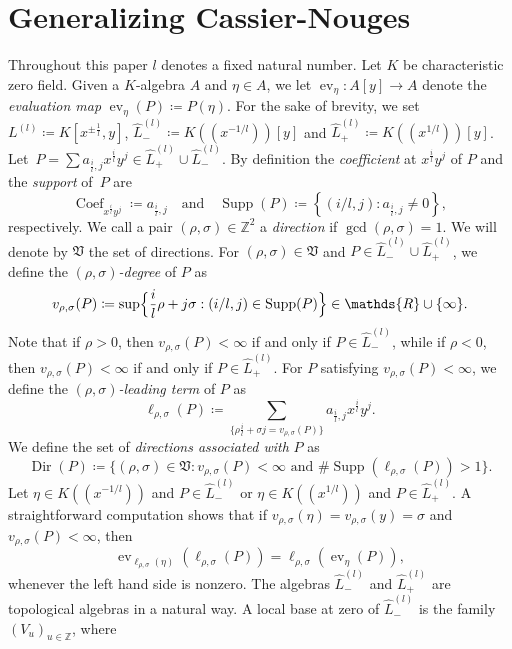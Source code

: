 \documentclass[reqno,a4paper]{amsart}
\theoremstyle{definition}
\theoremstyle{remark}
\DeclareMathOperator{\Supp}{Supp}
\DeclareMathOperator{\ev}{ev}
\DeclareMathOperator{\Dir}{Dir}
\DeclareMathOperator{\Coef}{Coef}
\begin{document}
\section{Generalizing Cassier-Nouges}

Throughout this paper $l$ denotes a fixed natural number. Let $K$ be characteristic zero field. Given a $K$-algebra $A$ and $\eta\in A$, we let
$\ev_{\eta}\colon A[y]\to A$ denote the {\em evaluation map} $\ev_{\eta}(P)\coloneqq P(\eta)$. For the sake of brevity, we set $L^{(l)}\coloneqq K[x^{\pm \frac{1}{l}},y]$, $\hat L_-^{(l)}\coloneqq K((x^{-1/l}))[y]$ and $\hat L_+^{(l)}\coloneqq K((x^{1/l}))[y]$. Let~$P=\sum a_{\frac{i}{l},j} x^{\frac{i}{l}} y^j \in \hat L_+^{(l)}\cup \hat L_-^{(l)}$. By definition the {\em coefficient} at $x^{\frac{i}{l}}y^j$ of $P$ and the {\em support} of~$P$ are
$$
\Coef_{x^{\frac{i}{l}} y^j}\coloneqq a_{\frac{i}{l},j}\quad\text{and}\quad \Supp(P) \coloneqq  \left\{\left(i/l,j\right): a_{\frac{i}{l},j}\ne 0\right\},
$$
respectively. We call a pair $(\rho,\sigma)\in \mathds{Z}^2$ a {\em direction} if $\gcd(\rho,\sigma)=1$. We will denote by $\mathfrak{V}$ the set of directions. For $(\rho,\sigma)\in \mathfrak{V}$ and $P\in \hat L_-^{(l)}\cup \hat L_+^{(l)}$, we define the {\em $(\rho,\sigma)$-degree} of $P$ as
$$
v_{\rho,\sigma}(P)\coloneqq  \sup\Bigl\{\frac{i}{l} \rho +j\sigma : (i/l,j) \in \Supp(P)\Bigr\}\in \mathds{R}\cup\{\infty\}.
$$
Note that if $\rho>0$, then $v_{\rho,\sigma}(P)<\infty$ if and only if $P\in \hat L_-^{(l)}$, while if $\rho<0$, then $v_{\rho,\sigma}(P)<\infty$ if and only if $P\in \hat L_+^{(l)}$. For $P$ satisfying $v_{\rho,\sigma}(P)<\infty$, we define the {\em $(\rho,\sigma)$-leading term} of $P$ as
$$
\ell_{\rho,\sigma}(P)\coloneqq   \sum_{\{\rho \frac{i}{l} + \sigma j = v_{\rho,\sigma}(P)\}} a_{\frac{i}{l},j} x^{\frac{i}{l}} y^j.
$$
We define the set of {\em directions associated with} $P$ as
$$
\Dir(P)\coloneqq \{(\rho,\sigma)\in\mathfrak{V}:v_{\rho,\sigma}(P)<\infty\text{ and }\#\Supp(\ell_{\rho,\sigma}(P))>1\}.
$$
Let $\eta\in K((x^{-1/l}))$ and $P\in \hat L_-^{(l)}$ or $\eta\in K((x^{1/l}))$ and $P\in \hat L_+^{(l)}$. A straightforward computation shows that if $v_{\rho,\sigma}(\eta)=v_{\rho,\sigma}(y)=\sigma$ and $v_{\rho,\sigma}(P)<\infty$, then
\begin{equation}\label{evaluacion en el borde}
\ev_{\ell_{\rho,\sigma}(\eta)}(\ell_{\rho,\sigma}(P))=\ell_{\rho,\sigma}(\ev_{\eta}(P)),
\end{equation}
whenever the left hand side is nonzero. The algebras $\hat L_-^{(l)}$ and $\hat L_+^{(l)}$ are topological algebras in a natural way. A local base at zero of $\hat L_-^{(l)}$ is the family $(V_u)_{u\in \mathds{Z}}$, where
\end{document}
